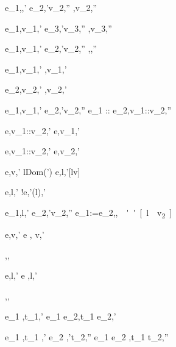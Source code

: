   {e_1,\sigma\eval \True,\sigma'\Quad
   e_2,\sigma'\eval v_2,\sigma''}
  {,\sigma\eval v_2,\sigma''}

  {e_1,\sigma\eval v_1,\sigma' \Quad
   e_3,\sigma'\eval v_3,\sigma''}
  {,\sigma\eval v_3,\sigma''}


  {e_1,\sigma\eval v_1,\sigma' \Quad
   e_2,\sigma'\eval v_2,\sigma''}
  {,\sigma\eval{},\sigma''}

  {e_1,\sigma\eval v_1,\sigma'}
  {\Fst{},\sigma\eval v_1,\sigma'}

  {e_2,\sigma\eval v_2,\sigma'}
  {\Snd{},\sigma\eval v_2,\sigma' }


  {e_1,\sigma\eval v_1,\sigma'\Quad
   e_2,\sigma'\eval v_2,\sigma''}
  {e_1 :: e_2,\sigma\eval v_1::v_2,\sigma''}

  {e,\sigma\eval v_1::v_2,\sigma'}
  {\Head e,\sigma\eval v_1,\sigma'}

{e,\sigma\eval v_1::v_2,\sigma'}
{\Tail e,\sigma\eval v_2,\sigma'}



  {e,\sigma\eval v,\sigma' \Quad
   l\not\in Dom(\sigma')}
  {\Share e,\sigma\eval l,\sigma'[l\mapsto v]}

  {e,\sigma\eval l,\sigma'}
  {!e,\sigma\eval \sigma'(l),\sigma'}

  {e_1,\sigma\eval l,\sigma' \Quad
   e_2,\sigma'\eval v_2,\sigma''}
  {e_1:=e_2,\sigma\eval \unit,\sigma''[l\mapsto v_2]}

  {e,\sigma \eval v,\sigma'}
  {\Update e , \sigma\eval \Update v,\sigma'}

  {}
  {\Enter \tau,\sigma \eval \Enter \tau,\sigma}

  {e,\sigma\eval l,\sigma'}
  {\Update e ,\sigma\eval \Update l,\sigma'}


  {}
  {\Fail,\sigma \eval \Fail,\sigma}


  {e_1 ,\sigma\eval t_1,\sigma'}
  {e_1 \Step e_2,\sigma\eval t_1 \Step e_2,\sigma'}



  {e_1 ,\sigma\eval t_1 ,\sigma'\Quad
   e_2 ,\sigma'\eval t_2,\sigma''}
  {e_1 \Pair e_2 ,\sigma\eval t_1 \Pair t_2,\sigma''}


